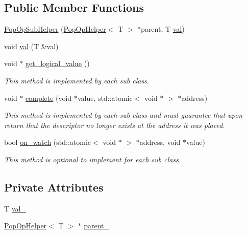 \subsection*{Public Member Functions}
\begin{DoxyCompactItemize}
\item 
\hyperlink{classtervel_1_1containers_1_1wf_1_1vector_1_1_pop_op_sub_helper_a427afa23f9b23da97724a550956aac59}{Pop\+Op\+Sub\+Helper} (\hyperlink{classtervel_1_1containers_1_1wf_1_1vector_1_1_pop_op_helper}{Pop\+Op\+Helper}$<$ T $>$ $\ast$parent, T \hyperlink{classtervel_1_1containers_1_1wf_1_1vector_1_1_pop_op_sub_helper_a50f35566adc28c29e64593f3159aa96a}{val})
\item 
void \hyperlink{classtervel_1_1containers_1_1wf_1_1vector_1_1_pop_op_sub_helper_a50f35566adc28c29e64593f3159aa96a}{val} (T \&val)
\item 
void $\ast$ \hyperlink{classtervel_1_1containers_1_1wf_1_1vector_1_1_pop_op_sub_helper_a2b908a6e906f82a63af7e662fd6407cd}{get\+\_\+logical\+\_\+value} ()
\begin{DoxyCompactList}\small\item\em This method is implemented by each sub class. \end{DoxyCompactList}\item 
void $\ast$ \hyperlink{classtervel_1_1containers_1_1wf_1_1vector_1_1_pop_op_sub_helper_a8dc2729e8f7ed857c55df0f56361622b}{complete} (void $\ast$value, std\+::atomic$<$ void $\ast$ $>$ $\ast$address)
\begin{DoxyCompactList}\small\item\em This method is implemented by each sub class and must guarantee that upon return that the descriptor no longer exists at the address it was placed. \end{DoxyCompactList}\item 
bool \hyperlink{classtervel_1_1containers_1_1wf_1_1vector_1_1_pop_op_sub_helper_ae0fcfb9527874f0b321b0fd48a295833}{on\+\_\+watch} (std\+::atomic$<$ void $\ast$ $>$ $\ast$address, void $\ast$value)
\begin{DoxyCompactList}\small\item\em This method is optional to implement for each sub class. \end{DoxyCompactList}\end{DoxyCompactItemize}
\subsection*{Private Attributes}
\begin{DoxyCompactItemize}
\item 
T \hyperlink{classtervel_1_1containers_1_1wf_1_1vector_1_1_pop_op_sub_helper_a7957cf169b647bdad67fa9a577a6ebcf}{val\+\_\+}
\item 
\hyperlink{classtervel_1_1containers_1_1wf_1_1vector_1_1_pop_op_helper}{Pop\+Op\+Helper}$<$ T $>$ $\ast$ \hyperlink{classtervel_1_1containers_1_1wf_1_1vector_1_1_pop_op_sub_helper_a8026aadc97236024880ec507b252d7f8}{parent\+\_\+}
\end{DoxyCompactItemize}


